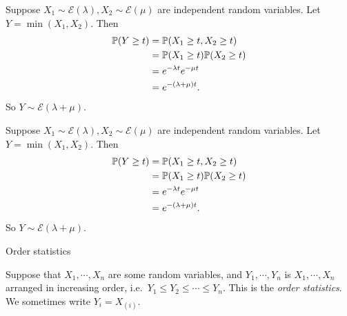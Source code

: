 \begin{note}
  \begin{field}
    \begin{eg}
      Suppose $X_1\sim \mathcal{E}(\lambda), X_2\sim \mathcal{E}(\mu)$ are independent random variables. Let $Y = \min(X_1, X_2)$. Then
      \begin{align*}
        \P(Y \geq t) &= \P(X_1 \geq t, X_2 \geq t)\\
        &= \P(X_1\geq t)\P(X_2 \geq t)\\
        &= e^{-\lambda t}e^{-\mu t}\\
        &= e^{-(\lambda +\mu)t}.
      \end{align*}
      So $Y\sim \mathcal{E}(\lambda + \mu)$.
    \end{eg}
  \end{field}
  \begin{field}
    \begin{eg}
      Suppose $X_1\sim \mathcal{E}(\lambda), X_2\sim \mathcal{E}(\mu)$ are independent random variables. Let $Y = \min(X_1, X_2)$. Then
      \begin{align*}
        \P(Y \geq t) &= \P(X_1 \geq t, X_2 \geq t)\\
        &= \P(X_1\geq t)\P(X_2 \geq t)\\
        &= e^{-\lambda t}e^{-\mu t}\\
        &= e^{-(\lambda +\mu)t}.
      \end{align*}
      So $Y\sim \mathcal{E}(\lambda + \mu)$.
    \end{eg}
  \end{field}
  \xplain{}%
\end{note}

%
\begin{note}
  \begin{field}
    Order statistics
  \end{field}
  \begin{field}
    \begin{defi}
      Suppose that $X_1, \cdots, X_n$ are some random variables, and $Y_1, \cdots, Y_n$ is $X_1, \cdots, X_n$ arranged in increasing order, i.e.\ $Y_1 \leq Y_2 \leq \cdots \leq Y_n$. This is the \emph{order statistics}.
      We sometimes write $Y_i = X_{(i)}$.
    \end{defi}
  \end{field}
  \xplain{}%
\end{note}


